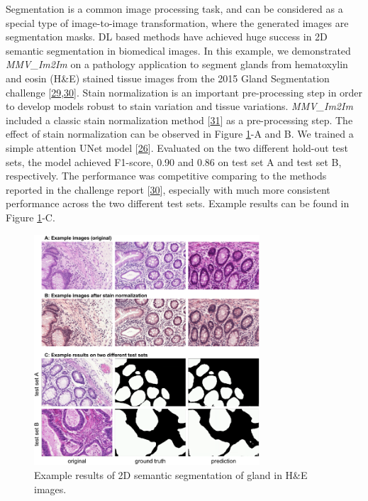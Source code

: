 Segmentation is a common image processing task, and can be considered as a special type of image-to-image transformation, where the generated images are segmentation masks. DL based methods have achieved huge success in 2D semantic segmentation in biomedical images. In this example, we demonstrated \emph{MMV\_Im2Im} on a pathology application to segment glands from hematoxylin and eosin (H\&E) stained tissue images from the 2015 Gland Segmentation challenge {[}\protect\hyperlink{ref-45Sirz1X}{29},\protect\hyperlink{ref-XAffSYIR}{30}{]}. Stain normalization is an important pre-processing step in order to develop models robust to stain variation and tissue variations. \emph{MMV\_Im2Im} included a classic stain normalization method {[}\protect\hyperlink{ref-tQhnZyjK}{31}{]} as a pre-processing step. The effect of stain normalization can be observed in Figure \ref{fig:2d_gland}-A and B. We trained a simple attention UNet model {[}\protect\hyperlink{ref-OCow1hly}{26}{]}. Evaluated on the two different hold-out test sets, the model achieved F1-score, 0.90 and 0.86 on test set A and test set B, respectively. The performance was competitive comparing to the methods reported in the challenge report {[}\protect\hyperlink{ref-XAffSYIR}{30}{]}, especially with much more consistent performance across the two different test sets. Example results can be found in Figure \ref{fig:2d_gland}-C.

\begin{figure}
\hypertarget{fig:2d_gland}{%
\centering
\includegraphics[width=0.75\textwidth,height=\textheight]{images/gland.png}
\caption{Example results of 2D semantic segmentation of gland in H\&E images.}\label{fig:2d_gland}
}
\end{figure}

